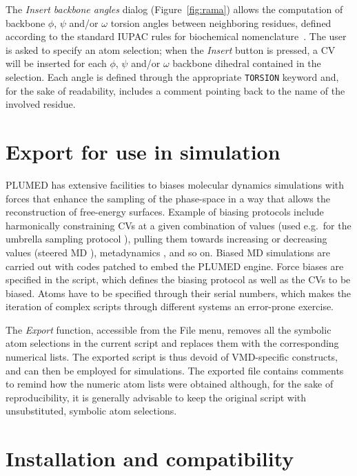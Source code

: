 \documentclass[preprint,review,11pt]{elsarticle}
\begin{document}
The \emph{Insert backbone angles} dialog (Figure~\ref{fig:rama})
allows the computation of backbone $\phi$, $\psi$ and/or $\omega$
torsion angles between neighboring residues, defined according to the
standard IUPAC rules for biochemical nomenclature~\cite{IUPAC}.  The
user is asked to specify an atom selection; when the \emph{Insert}
button is pressed, a CV will be inserted for each $\phi$, $\psi$
and/or $\omega$ backbone dihedral contained in the selection. Each
angle is defined through the appropriate \texttt{TORSION} keyword and,
for the sake of readability, includes a comment pointing back to the
name of the involved residue.






\section{Export for use in simulation}\label{sec:export-use-simul}

PLUMED has extensive facilities to biases molecular dynamics
simulations with forces that enhance the sampling of the phase-space
in a way that allows the reconstruction of free-energy
surfaces. Example of biasing protocols include harmonically
constraining CVs at a given combination of values (used e.g.\ for the
umbrella sampling protocol \cite{Torrie_Valleau_1977}), pulling them
towards increasing or decreasing values (steered MD
\cite{Isralewitz_Gao_Schulten_2001,Giorgino_2011}), metadynamics
\cite{Laio_Parrinello_2002}, and so on. Biased MD simulations are
carried out with codes patched to embed the PLUMED engine. Force
biases are specified in the script, which defines the biasing protocol
as well as the CVs to be biased.  Atoms have to be specified
through their serial numbers, which makes the iteration of complex
scripts through different systems an error-prone exercise.

The \emph{Export} function, accessible from the File menu, removes all
the symbolic atom selections in the current script and replaces them
with the corresponding numerical lists. The exported script is thus
devoid of VMD-specific constructs, and can then be employed for
simulations.  The exported file contains comments to remind how the
numeric atom lists were obtained although, for the sake of
reproducibility, it is generally advisable to keep the original
script with unsubstituted, symbolic atom selections.



\section{Installation and compatibility}
\end{document}

